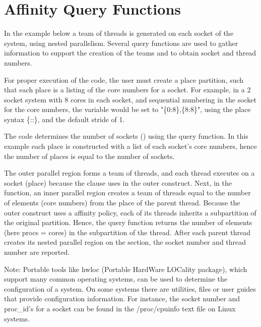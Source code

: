 \section{Affinity Query Functions}
\label{sec: affinity_query}

In the example below a team of threads is generated on each socket of
the system, using nested parallelism. Several query functions are used
to gather information to support the creation of the teams and to obtain 
socket and thread numbers.

For proper execution of the code, the user must create a place partition, such that
each place is a listing of the core numbers for a socket. For example,
in a 2 socket system with 8 cores in each socket, and sequential numbering
in the socket for the core numbers, the  variable would be set
to "\{0:8\},\{8:8\}", using the place syntax \{::\},
and the default stride of 1.

The code determines the number of sockets ()
using the  query function.
In this example each place is constructed with a list of 
each socket's core numbers, hence the number of places is equal
to the number of sockets. 

The outer parallel region forms a team of threads, and each thread 
executes on a socket (place) because the  clause uses 
 in the outer  construct.
Next, in the  function, an inner parallel region creates a team 
of threads equal to the number of elements (core numbers) from the place
of the parent thread. Because the outer  construct uses 
a  affinity policy, each of its threads inherits a subpartition of 
the original partition.  Hence, the  query function
returns the number of elements (here procs = cores) in the subpartition of the thread.  
After each parent thread creates its nested parallel region on the section,
the socket number and thread number are reported.

Note: Portable tools like hwloc (Portable HardWare LOCality package), which support
many common operating systems, can be used to determine the configuration of a system.  
On some systems there are utilities, files or user guides that provide configuration
information.  For instance, the socket number and proc\_id's for a socket 
can be found in the /proc/cpuinfo text file on Linux systems.



